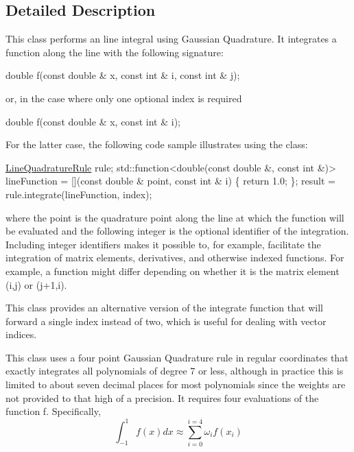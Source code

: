 \subsection{Detailed Description}
This class performs an line integral using Gaussian Quadrature. It integrates a function along the line with the following signature\+: 
\begin{DoxyCode}
\textcolor{keywordtype}{double} f(\textcolor{keyword}{const} \textcolor{keywordtype}{double} & x, \textcolor{keyword}{const} \textcolor{keywordtype}{int} & i, \textcolor{keyword}{const} \textcolor{keywordtype}{int} & j);
\end{DoxyCode}
 or, in the case where only one optional index is required 
\begin{DoxyCode}
\textcolor{keywordtype}{double} f(\textcolor{keyword}{const} \textcolor{keywordtype}{double} & x, \textcolor{keyword}{const} \textcolor{keywordtype}{int} & i);
\end{DoxyCode}
 For the latter case, the following code sample illustrates using the class\+: 
\begin{DoxyCode}
\hyperlink{a00885_ab811321337291e043129e0ec7d90f876}{LineQuadratureRule} rule;
std::function<double(\textcolor{keyword}{const} \textcolor{keywordtype}{double} &,
   \textcolor{keyword}{const} \textcolor{keywordtype}{int} &)> lineFunction = [](\textcolor{keyword}{const} \textcolor{keywordtype}{double} & point,
   \textcolor{keyword}{const} \textcolor{keywordtype}{int} & i) \{
   \textcolor{keywordflow}{return} 1.0;
\};
result = rule.integrate(lineFunction, index);
\end{DoxyCode}
 where the point is the quadrature point along the line at which the function will be evaluated and the following integer is the optional identifier of the integration. Including integer identifiers makes it possible to, for example, facilitate the integration of matrix elements, derivatives, and otherwise indexed functions. For example, a function might differ depending on whether it is the matrix element (i,j) or (j+1,i).

This class provides an alternative version of the integrate function that will forward a single index instead of two, which is useful for dealing with vector indices.

This class uses a four point Gaussian Quadrature rule in regular coordinates that exactly integrates all polynomials of degree 7 or less, although in practice this is limited to about seven decimal places for most polynomials since the weights are not provided to that high of a precision. It requires four evaluations of the function f. Specifically, \[ \int_{-1}^{1} f(x) dx \approx \sum_{i=0}^{i=4} \omega_{i}f(x_{i}) \]

